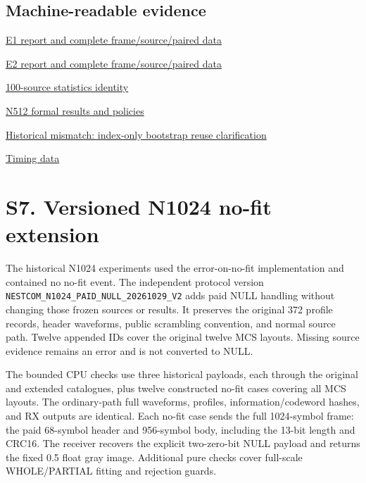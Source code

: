 \documentclass[11pt,letterpaper]{article}
\begin{document}
\subsection*{Machine-readable evidence}

\href{https://github.com/daiqizai/var-comm/blob/93205a2e007ac587e28246cd399a531347a4f3f7/results/nestcom_evidence_20261029_v1/e1/REPORT_zh.md}{E1 report and complete frame/source/paired data}\par
\href{https://github.com/daiqizai/var-comm/blob/93205a2e007ac587e28246cd399a531347a4f3f7/results/nestcom_evidence_20261029_v1/e2/REPORT_zh.md}{E2 report and complete frame/source/paired data}\par
\href{https://github.com/daiqizai/var-comm/blob/93205a2e007ac587e28246cd399a531347a4f3f7/results/nestcom_evidence_20261029_v1/statistics_identity.json}{100-source statistics identity}\par
\href{https://github.com/daiqizai/var-comm/blob/93205a2e007ac587e28246cd399a531347a4f3f7/results/nestcom_n512_20261028_v1/delivery/REPORT.md}{N512 formal results and policies}\par
\href{https://github.com/daiqizai/var-comm/blob/93205a2e007ac587e28246cd399a531347a4f3f7/results/wcl_revision_20261027_v1/p1_bootstrap_clarification_v1.md}{Historical mismatch: index-only bootstrap reuse clarification}\par
\href{https://github.com/daiqizai/var-comm/blob/93205a2e007ac587e28246cd399a531347a4f3f7/results/five_method_timing_20261020_v1/delivery/summary_ms_per_image.csv}{Timing data}\par

\clearpage\section*{S7. Versioned N1024 no-fit extension}
The historical N1024 experiments used the error-on-no-fit implementation and contained no no-fit event. The independent protocol version \texttt{NESTCOM\_N1024\_PAID\_NULL\_20261029\_V2} adds paid NULL handling without changing those frozen sources or results. It preserves the original 372 profile records, header waveforms, public scrambling convention, and normal source path. Twelve appended IDs cover the original twelve MCS layouts. Missing source evidence remains an error and is not converted to NULL.

The bounded CPU checks use three historical payloads, each through the original and extended catalogues, plus twelve constructed no-fit cases covering all MCS layouts. The ordinary-path full waveforms, profiles, information/codeword hashes, and RX outputs are identical. Each no-fit case sends the full 1024-symbol frame: the paid 68-symbol header and 956-symbol body, including the 13-bit length and CRC16. The receiver recovers the explicit two-zero-bit NULL payload and returns the fixed 0.5 float gray image. Additional pure checks cover full-scale WHOLE/PARTIAL fitting and rejection guards.
\end{document}
